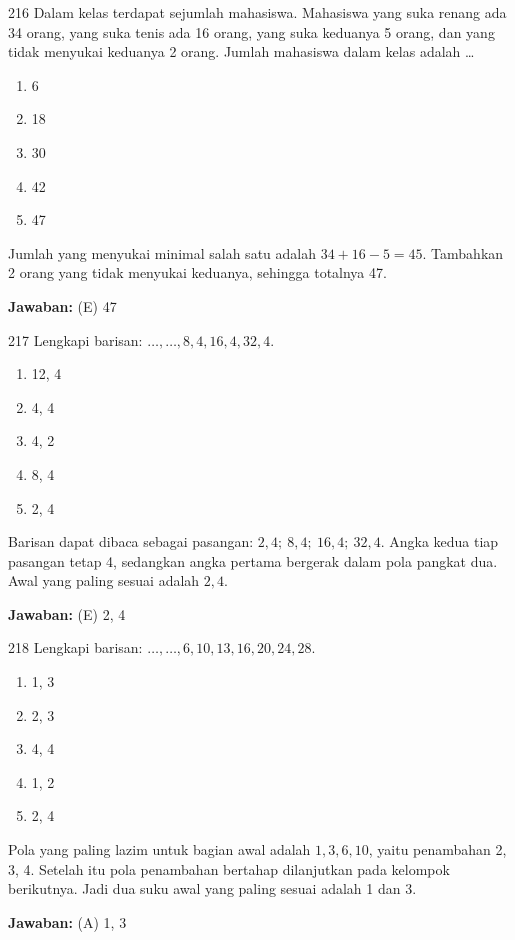 \documentclass[11pt]{article}
\newenvironment{pil}{\begin{enumerate}[label=(\Alph*),leftmargin=*,itemsep=1pt,topsep=3pt]}{\end{enumerate}}
\newcommand{\jw}[1]{\par\smallskip\begin{jawbox}\textbf{Jawaban:} #1\end{jawbox}}
\begin{document}
\begin{soalbox}{2}{16}
Dalam kelas terdapat sejumlah mahasiswa. Mahasiswa yang suka renang ada 34 orang, yang suka tenis ada 16 orang, yang suka keduanya 5 orang, dan yang tidak menyukai keduanya 2 orang. Jumlah mahasiswa dalam kelas adalah \ldots
\begin{pil}\item 6 \item 18 \item 30 \item 42 \item 47\end{pil}
\end{soalbox}
\begin{pembox}
Jumlah yang menyukai minimal salah satu adalah $34+16-5=45$. Tambahkan 2 orang yang tidak menyukai keduanya, sehingga totalnya 47.
\jw{(E) 47}
\end{pembox}

\begin{soalbox}{2}{17}
Lengkapi barisan: $\ldots, \ldots, 8, 4, 16, 4, 32, 4$.
\begin{pil}\item 12, 4 \item 4, 4 \item 4, 2 \item 8, 4 \item 2, 4\end{pil}
\end{soalbox}
\begin{pembox}
Barisan dapat dibaca sebagai pasangan: $2,4;\ 8,4;\ 16,4;\ 32,4$. Angka kedua tiap pasangan tetap 4, sedangkan angka pertama bergerak dalam pola pangkat dua. Awal yang paling sesuai adalah $2, 4$.
\jw{(E) 2, 4}
\end{pembox}

\begin{soalbox}{2}{18}
Lengkapi barisan: $\ldots, \ldots, 6, 10, 13, 16, 20, 24, 28$.
\begin{pil}\item 1, 3 \item 2, 3 \item 4, 4 \item 1, 2 \item 2, 4\end{pil}
\end{soalbox}
\begin{pembox}
Pola yang paling lazim untuk bagian awal adalah $1, 3, 6, 10$, yaitu penambahan 2, 3, 4. Setelah itu pola penambahan bertahap dilanjutkan pada kelompok berikutnya. Jadi dua suku awal yang paling sesuai adalah 1 dan 3.
\jw{(A) 1, 3}
\end{pembox}
\end{document}
